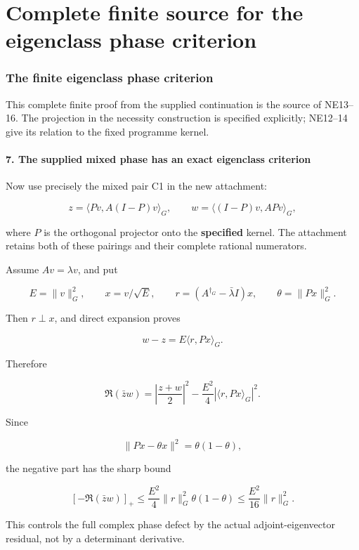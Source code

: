 \documentclass[11pt]{article}
\begin{document}
\clearpage\part{Complete finite source for the eigenclass phase criterion}
\label{part:6}
\section{The finite eigenclass phase criterion}\label{the-finite-eigenclass-phase-criterion}

This complete finite proof from the supplied continuation is the source of NE13--16. The projection in the necessity construction is specified explicitly; NE12--14 give its relation to the fixed programme kernel.

\subsection{7. The supplied mixed phase has an exact eigenclass criterion}\label{the-supplied-mixed-phase-has-an-exact-eigenclass-criterion}

Now use precisely the mixed pair C1 in the new attachment:

\[
z=\langle Pv,A(I-P)v\rangle_G,
\qquad
w=\langle(I-P)v,APv\rangle_G,
\]

where \(P\) is the orthogonal projector onto the \textbf{specified} kernel. The attachment retains both of these pairings and their complete rational numerators.

Assume \(Av=\lambda v\), and put

\[
E=\|v\|_G^2,\qquad
x=v/\sqrt E,\qquad
r=(A^{\dagger_G}-\bar\lambda I)x,
\qquad
\theta=\|Px\|_G^2.
\]

Then \(r\perp x\), and direct expansion proves

\[
w-z=E\langle r,Px\rangle_G.
\]

Therefore

\[
\boxed{
\Re(\bar zw)
=
\left|\frac{z+w}{2}\right|^2
-\frac{E^2}{4}|\langle r,Px\rangle_G|^2.
}
\tag{38}
\]

Since

\[
\|Px-\theta x\|^2=\theta(1-\theta),
\]

the negative part has the sharp bound

\[
\boxed{
[-\Re(\bar zw)]_+
\le
\frac{E^2}{4}\|r\|_G^2\theta(1-\theta)
\le
\frac{E^2}{16}\|r\|_G^2.
}
\tag{39}
\]

This controls the full complex phase defect by the actual adjoint-eigenvector residual, not by a determinant derivative.
\end{document}
